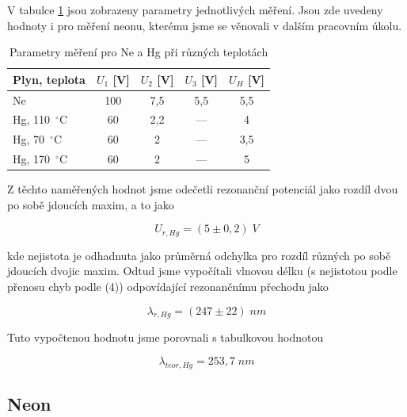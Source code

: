 V tabulce \ref{tab:napeti_FH} jsou zobrazeny parametry jednotlivých měření. Jsou zde uvedeny hodnoty i pro měření neonu, kterému jsme se věnovali v dalším pracovním úkolu.

\begin{table}[!h]
\centering
\caption{Parametry měření pro Ne a Hg při různých teplotách}
\label{tab:napeti_FH}
\begingroup
\setlength{\tabcolsep}{10pt}     %
\renewcommand{\arraystretch}{1.2} %
\begin{tabular}{lcccc}
\hline
\textbf{Plyn, teplota} & \textbf{$U_1$ [V]} & \textbf{$U_2$ [V]} & \textbf{$U_3$ [V]} & \textbf{$U_H$ [V]} \\
\hline
Ne & 100 & 7,5 & 5,5 & 5,5 \\
Hg, 110~$^{\circ}$C & 60 & 2,2 & --- & 4 \\
Hg, 70~$^{\circ}$C & 60 & 2 & --- & 3,5 \\
Hg, 170~$^{\circ}$C & 60 & 2 & --- & 5 \\
\hline
\end{tabular}
\endgroup
\end{table}

\newpage

Z těchto naměřených hodnot jsme odečetli rezonanční potenciál jako rozdíl dvou po sobě jdoucích maxim, a to jako

\begin{equation}
    U_{r,Hg} = (5 \pm 0,2) \; V
\end{equation}

kde nejistota je odhadnuta jako průměrná odchylka pro rozdíl různých po sobě jdoucích dvojic maxim. Odtud jsme vypočítali vlnovou délku (s nejistotou podle přenosu chyb podle (4)) odpovídající rezonančnímu přechodu jako

\begin{equation}
    \lambda_{r,Hg} = (247 \pm 22) \; nm
\end{equation}

Tuto vypočtenou hodnotu jsme porovnali s tabulkovou hodnotou

\begin{equation}
    \lambda_{teor,Hg} = 253,7 \; nm
\end{equation}

\newpage

\subsection{Neon}

